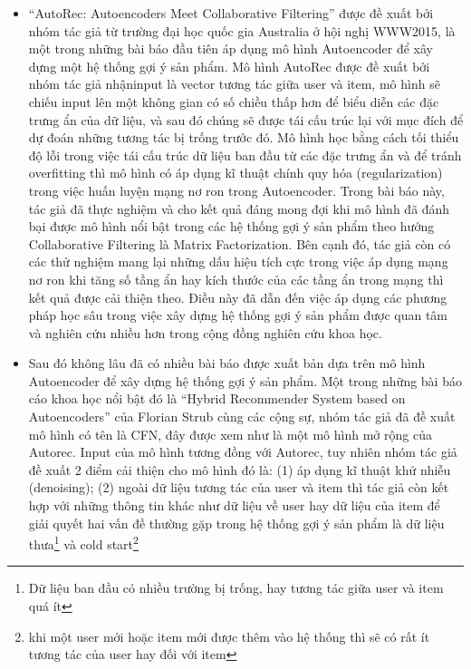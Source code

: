\documentclass{article}[14pt]
\begin{document}
{\begin{itemize}
    \item   “AutoRec: Autoencoders Meet Collaborative Filtering”\cite{autorec} được đề xuất bởi 
    nhóm tác giả từ trường đại học quốc gia Australia  ở hội nghị WWW2015, là một 
    trong những bài báo đầu tiên áp dụng mô hình Autoencoder để xây dựng một hệ 
    thống gợi ý sản phẩm. Mô hình AutoRec được đề xuất bởi nhóm tác giả nhậninput 
    là vector tương tác giữa user và item, mô hình sẽ chiếu input lên một không 
    gian có số chiều thấp hơn để biểu diễn các đặc trưng ẩn của dữ liệu, và sau 
    đó chúng sẽ được tái cấu trúc lại với mục đích để dự đoán những tương tác bị 
    trống trước đó. Mô hình học bằng cách tối thiểu độ lỗi trong việc tái cấu 
    trúc dữ liệu ban đầu từ các đặc trưng ẩn và để tránh overfitting thì mô hình 
    có áp dụng kĩ thuật chính quy hóa (regularization) trong việc huấn luyện mạng 
    nơ ron trong Autoencoder. Trong bài báo này, tác giả đã thực nghiệm và cho 
    kết quả đáng mong đợi khi mô hình đã đánh bại được mô hình nổi bật trong các 
    hệ thống gợi ý sản phẩm theo hướng Collaborative Filtering là Matrix 
    Factorization. Bên cạnh đó, tác giả còn có các thử nghiệm mang lại những dấu 
    hiệu tích cực trong việc áp dụng mạng nơ ron khi tăng số tầng ẩn hay kích 
    thước của các tầng ẩn trong mạng thì kết quả được cải thiện theo. Điều này đã 
    dẫn đến việc áp dụng các phương pháp học sâu trong việc xây dựng hệ thống gợi 
    ý sản phẩm được quan tâm và nghiên cứu nhiều hơn trong cộng đồng nghiên cứu 
    khoa học.
    \item Sau đó không lâu đã có nhiều bài báo được xuất bản dựa trên mô hình 
    Autoencoder để xây dựng hệ thống gợi ý sản phẩm. Một trong những bài báo cáo 
    khoa học nổi bật đó là “Hybrid Recommender System based on Autoencoders” 
    \cite{cfn} của Florian Strub cùng các cộng sự, nhóm tác giả đã đề xuất mô 
    hình có tên là CFN, đây được xem như là một mô hình mở rộng của Autorec. 
    Input của mô hình tương đồng với Autorec, tuy nhiên nhóm tác giả đề xuất 2 
    điểm cải thiện cho mô hình đó là: (1) áp dụng kĩ thuật khử nhiễu 
    (denoising); (2) ngoài dữ liệu tương tác của user và item thì tác giả còn 
    kết hợp với những thông tin khác như dữ liệu về user hay dữ liệu của item để 
    giải quyết hai vấn đề thường gặp trong hệ thống gợi ý sản phẩm là dữ liệu 
    thưa\footnote{Dữ liệu ban đầu có nhiều trường bị trống, hay tương tác giữa 
    user và item quá ít} và cold start\footnote{khi một user mới hoặc item mới 
    được thêm vào hệ thống thì sẽ có rất ít tương tác của user hay đối với item 
}
\end{itemize}}
\end{document}
